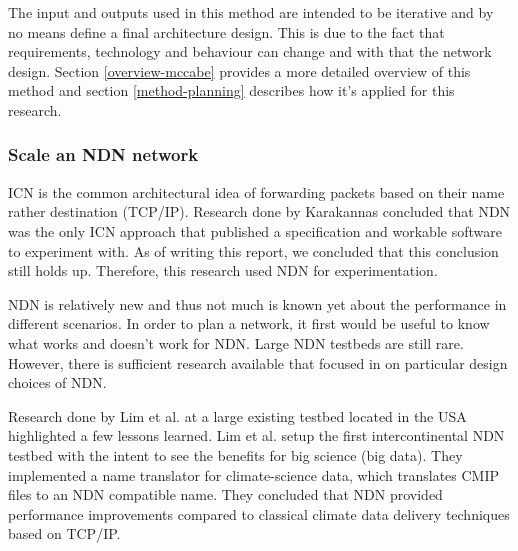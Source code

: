 The input and outputs used in this method are intended to be iterative and by no means define a final architecture design. This is due to the fact that requirements, technology and behaviour can change and with that the network design. Section \ref{overview-mccabe} provides a more detailed overview of this method and section \ref{method-planning} describes how it's applied for this research.



\subsubsection{Scale an NDN network}
ICN is the common architectural idea of forwarding packets based on their name rather destination (TCP/IP). Research done by Karakannas \cite{icn-bd} concluded that NDN was the only ICN approach that published a specification and workable software to experiment with. As of writing this report, we concluded that this conclusion still holds up. Therefore, this research used NDN for experimentation.

NDN is relatively new and thus not much is known yet about the performance in different scenarios. In order to plan a network, it first would be useful to know what works and doesn't work for NDN. Large NDN testbeds are still rare. However, there is sufficient research available that focused in on particular design choices of NDN. 

Research done by Lim et al. \cite{lim2018ndn} at a large existing testbed located in the USA \cite{ndn-testbed-status} highlighted a few lessons learned. Lim et al. setup the first intercontinental NDN testbed with the intent to see the benefits for big science (big data). They implemented a name translator for climate-science data, which translates CMIP files to an NDN compatible name. They concluded that NDN provided performance improvements compared to classical climate data delivery techniques based on TCP/IP.

